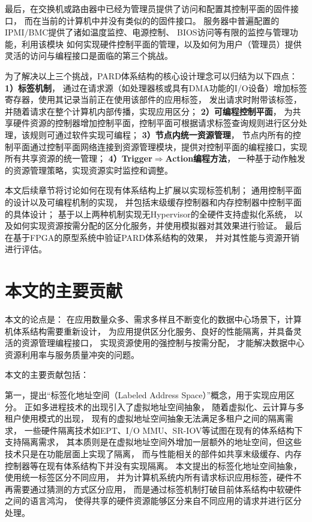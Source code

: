 最后，在交换机或路由器中已经为管理员提供了访问和配置其控制平面的固件接口，
而在当前的计算机中并没有类似的的固件接口。
服务器中普遍配置的IPMI/BMC\cite{ipmi}提供了诸如温度监控、电源控制、
BIOS访问等有限的监控与管理功能，利用该模块
如何实现硬件控制平面的管理，以及如何为用户（管理员）提供灵活的访问与编程接口是面临的第三个挑战。

为了解决以上三个挑战，PARD体系结构的核心设计理念可以归结为以下四点：
\textbf{1）标签机制}，
通过在请求源（如处理器核或具有DMA功能的I/O设备）增加标签寄存器，使用其记录当前正在使用该部件的应用标签，
发出请求时附带该标签，并随着请求在整个计算机内部传播，实现应用区分；
\textbf{2）可编程控制平面}，
为共享硬件资源的控制器增加控制平面，控制平面可根据请求标签查询规则进行区分处理，该规则可通过软件实现可编程；
\textbf{3）节点内统一资源管理}，
节点内所有的控制平面通过控制平面网络连接到资源管理模块，提供对控制平面的编程接口，实现所有共享资源的统一管理；
\textbf{4）Trigger$\Rightarrow$Action编程方法}，
一种基于动作触发的资源管理策略，实现资源实时监控和调整。

本文后续章节将讨论如何在现有体系结构上扩展以实现标签机制；
通用控制平面的设计以及可编程机制的实现，
并包括末级缓存控制器和内存控制器中控制平面的具体设计；
基于以上两种机制实现无Hypervisor的全硬件支持虚拟化系统，
以及如何实现资源按需分配的区分化服务，并使用模拟器对其效果进行验证。
最后在基于FPGA的原型系统中验证PARD体系结构的效果，
并对其性能与资源开销进行评估。


\section{本文的主要贡献}

本文的论点是：
在应用数量众多、需求多样且不断变化的数据中心场景下，计算机体系结构需要重新设计，
为应用提供区分化服务、良好的性能隔离，并具备灵活的资源管理编程接口，
实现资源使用的强控制与按需分配，
才能解决数据中心资源利用率与服务质量冲突的问题。

本文的主要贡献包括：

第一，提出``标签化地址空间（Labeled Address Space）''概念，用于实现应用区分。
正如多进程技术的出现引入了虚拟地址空间抽象，
随着虚拟化、云计算与多租户使用模式的出现，
现有的虚拟地址空间抽象无法满足多租户之间的隔离需求，
一些硬件隔离技术如EPT、I/O MMU、SR-IOV等试图在现有的体系结构下支持隔离需求，
其本质则是在虚拟地址空间外增加一层额外的地址空间，但这些技术只是在功能层面上实现了隔离，
而与性能相关的部件如共享末级缓存、内存控制器等在现有体系结构下并没有实现隔离。
本文提出的标签化地址空间抽象，使用统一标签区分不同应用，
并为计算机系统内所有请求标识应用标签，硬件不再需要通过猜测的方式区分应用，
而是通过标签机制打破目前体系结构中软硬件之间的语言鸿沟，
使得共享的硬件资源能够区分来自不同应用的请求并进行区分处理。

